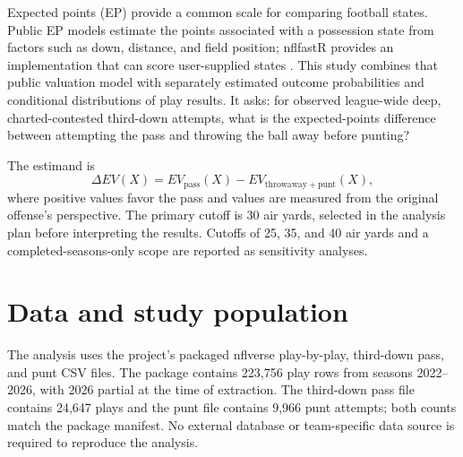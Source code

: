 \documentclass[11pt]{article}
\begin{document}
Expected points (EP) provide a common scale for comparing football states. Public EP models estimate the points associated with a possession state from factors such as down, distance, and field position; nflfastR provides an implementation that can score user-supplied states \cite{nflfastrEP,Yurko2019}. This study combines that public valuation model with separately estimated outcome probabilities and conditional distributions of play results. It asks: for observed league-wide deep, charted-contested third-down attempts, what is the expected-points difference between attempting the pass and throwing the ball away before punting?

The estimand is
\begin{equation}
  \Delta EV(X) = EV_{\mathrm{pass}}(X) - EV_{\mathrm{throwaway+punt}}(X),
\end{equation}
where positive values favor the pass and values are measured from the original offense's perspective. The primary cutoff is 30 air yards, selected in the analysis plan before interpreting the results. Cutoffs of 25, 35, and 40 air yards and a completed-seasons-only scope are reported as sensitivity analyses.

\section{Data and study population}

The analysis uses the project's packaged nflverse play-by-play, third-down pass, and punt CSV files. The package contains 223,756 play rows from seasons 2022--2026, with 2026 partial at the time of extraction. The third-down pass file contains 24,647 plays and the punt file contains 9,966 punt attempts; both counts match the package manifest. No external database or team-specific data source is required to reproduce the analysis.
\end{document}
